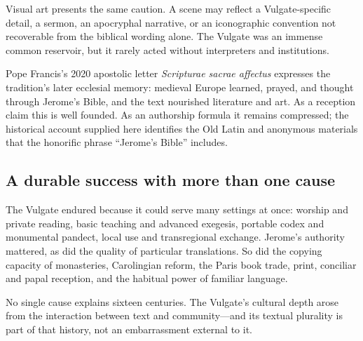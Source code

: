 Visual art presents the same caution. A scene may reflect a Vulgate-specific detail, a sermon, an apocryphal narrative, or an iconographic convention not recoverable from the biblical wording alone. The Vulgate was an immense common reservoir, but it rarely acted without interpreters and institutions.

Pope Francis's 2020 apostolic letter \emph{Scripturae sacrae affectus} expresses the tradition's later ecclesial memory: medieval Europe learned, prayed, and thought through Jerome's Bible, and the text nourished literature and art. As a reception claim this is well founded. As an authorship formula it remains compressed; the historical account supplied here identifies the Old Latin and anonymous materials that the honorific phrase ``Jerome's Bible'' includes.

\subsection{A durable success with more than one cause}

The Vulgate endured because it could serve many settings at once: worship and private reading, basic teaching and advanced exegesis, portable codex and monumental pandect, local use and transregional exchange. Jerome's authority mattered, as did the quality of particular translations. So did the copying capacity of monasteries, Carolingian reform, the Paris book trade, print, conciliar and papal reception, and the habitual power of familiar language.

No single cause explains sixteen centuries. The Vulgate's cultural depth arose from the interaction between text and community---and its textual plurality is part of that history, not an embarrassment external to it.
